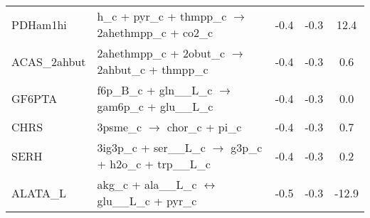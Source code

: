 \begin{longtable}{lp{}ccc}
PDHam1hi	&	h\_c + pyr\_c + thmpp\_c $\rightarrow$ 2ahethmpp\_c + co2\_c	&	-0.4	&	-0.3	&	12.4	\\
ACAS\_2ahbut	&	2ahethmpp\_c + 2obut\_c $\rightarrow$ 2ahbut\_c + thmpp\_c	&	-0.4	&	-0.3	&	0.6	\\
GF6PTA	&	f6p\_B\_c + gln\_\_L\_c $\rightarrow$ gam6p\_c + glu\_\_L\_c	&	-0.4	&	-0.3	&	0.0	\\
CHRS	&	3psme\_c $\rightarrow$ chor\_c + pi\_c	&	-0.4	&	-0.3	&	0.7	\\
SERH	&	3ig3p\_c + ser\_\_L\_c $\rightarrow$ g3p\_c + h2o\_c + trp\_\_L\_c	&	-0.4	&	-0.3	&	0.2	\\
ALATA\_L	&	akg\_c + ala\_\_L\_c $\leftrightarrow$ glu\_\_L\_c + pyr\_c	&	-0.5	&	-0.3	&	-12.9	\\

\end{longtable}
